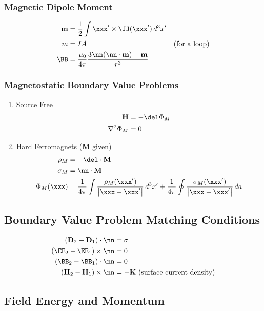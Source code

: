 \documentclass[11pt]{article}
\renewcommand{\HH}{\mathbf{H}}
\newcommand{\DD}{\mathbf{D}}
\newcommand{\MM}{\mathbf{M}}
\newcommand{\mm}{\mathbf{m}}
\begin{document}
\subsubsection{Magnetic Dipole Moment}
\label{sec:org0febd6c}
\begin{align*}
\mm & = \frac{1}{2} \int \xxx' \times \JJ(\xxx') \, d^3 x' \\
m & = I A & \mbox{(for a loop)} \\
\BB & = \frac{\mu_0}{4\pi} \frac{3\nn (\nn \cdot \mm) - \mm}{r^3}
\end{align*}
\subsubsection{Magnetostatic Boundary Value Problems}
\label{sec:org94623f9}
\begin{enumerate}
\item Source Free
\label{sec:org38e6e25}
\begin{align*}
\HH & = -\del \Phi_M \\
\nabla^2 \Phi_M & = 0
\end{align*}
\item Hard Ferromagnets (\(\MM\) given)
\label{sec:org9bee4dc}
\begin{align*}
\rho_M & = -\del \cdot \MM \\
\sigma_M & = \nn \cdot \MM \\
\Phi_M(\xxx) & = \frac{1}{4\pi} \int \frac{\rho_M(\xxx')}{\left| \xxx - \xxx' \right|} \, d^3 x'
               + \frac{1}{4\pi} \oint \frac{\sigma_M(\xxx')}{\left| \xxx - \xxx' \right|} \, da
\end{align*}
\end{enumerate}
\subsection{Boundary Value Problem Matching Conditions}
\label{sec:org1190639}
\begin{align*}
(\DD_2 - \DD_1) \cdot \nn & = \sigma \\
(\EE_2 - \EE_1) \times \nn & = 0 \\
(\BB_2 - \BB_1) \cdot \nn & = 0 \\
(\HH_2 - \HH_1) \times \nn & = -\mathbf{K} \mbox{ (surface current density)}
\end{align*}
\subsection{Field Energy and Momentum}
\label{sec:org3bdef52}
\end{document}

